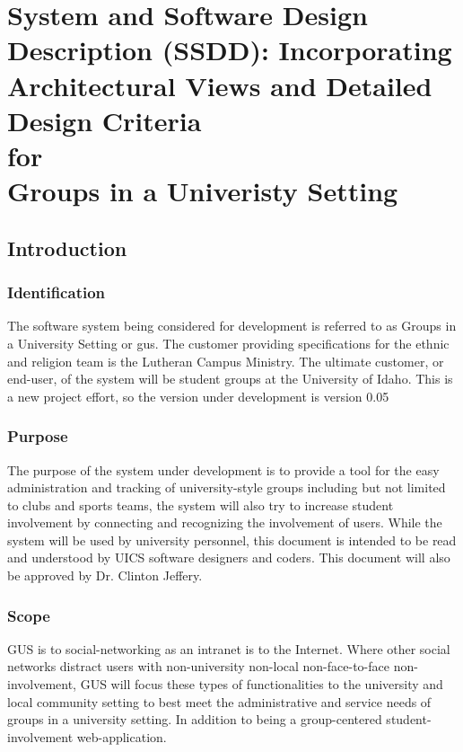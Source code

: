 \documentclass[12pt, oneside, letterpaper]{report}
\begin{document}
\part{System and Software Design Description (SSDD): Incorporating
     Architectural Views and Detailed Design Criteria \\ for \\ Groups in a
     Univeristy Setting}
\tableofcontents                                %
\listoffigures
\listoftables
\chapter{Introduction}
	\section{Identification}
		The software system being considered for development is referred
		to as Groups in a University Setting or gus. The customer providing
		specifications for the ethnic and religion team is the Lutheran
		Campus Ministry. The ultimate customer, or end-user, of the system
		will be student groups at the University of Idaho. This is a new
		project effort, so the version under development is version 0.05
	\section{Purpose}
		The purpose of the system under development is to provide a tool
		for the easy administration and tracking of university-style groups
		including but not limited to clubs and sports teams, the system will
		also try to increase student involvement by connecting and recognizing
		the involvement of users. While the system will be used by university
		personnel, this document is intended to be read and understood by UICS
		software designers and coders.  This document will also be approved by
		Dr. Clinton Jeffery.
	\section{Scope}
		GUS is to social-networking as an intranet is to the Internet.
		Where other social networks distract users with non-university
		non-local non-face-to-face non-involvement, GUS will focus these
		types of functionalities to the university and local community
		setting to best meet the administrative and service needs of groups
		in a university setting.  In addition to being a group-centered
		student-involvement web-application.
\end{document}
